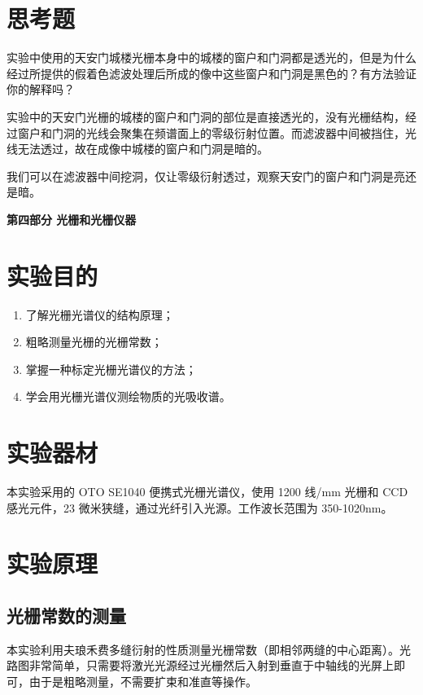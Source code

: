\documentclass[12pt]{article}
\begin{document}
\section{思考题}
{\kaishu 实验中使用的天安门城楼光栅本身中的城楼的窗户和门洞都是透光的，但是为什么经过所提供的假着色滤波处理后所成的像中这些窗户和门洞是黑色的？有方法验证你的解释吗？}

实验中的天安门光栅的城楼的窗户和门洞的部位是直接透光的，没有光栅结构，经过窗户和门洞的光线会聚集在频谱面上的零级衍射位置。而滤波器中间被挡住，光线无法透过，故在成像中城楼的窗户和门洞是暗的。

我们可以在滤波器中间挖洞，仅让零级衍射透过，观察天安门的窗户和门洞是亮还是暗。


\begin{center}
    {\Large \textbf{第四部分 \quad 光栅和光栅仪器}}
\end{center}

\setcounter{section}{0}
\section{实验目的}
\begin{enumerate}
    \item 了解光栅光谱仪的结构原理；
    \item 粗略测量光栅的光栅常数；
    \item 掌握一种标定光栅光谱仪的方法；
    \item 学会用光栅光谱仪测绘物质的光吸收谱。
\end{enumerate}

\section{实验器材}
本实验采用的 OTO SE1040 便携式光栅光谱仪，使用 1200 线/mm 光栅和 CCD感光元件，23 微米狭缝，通过光纤引入光源。工作波长范围为 350-1020nm。

\section{实验原理}
\subsection{光栅常数的测量}
本实验利用夫琅禾费多缝衍射的性质测量光栅常数（即相邻两缝的中心距离）。光路图非常简单，只需要将激光光源经过光栅然后入射到垂直于中轴线的光屏上即可，由于是粗略测量，不需要扩束和准直等操作。
\end{document}
